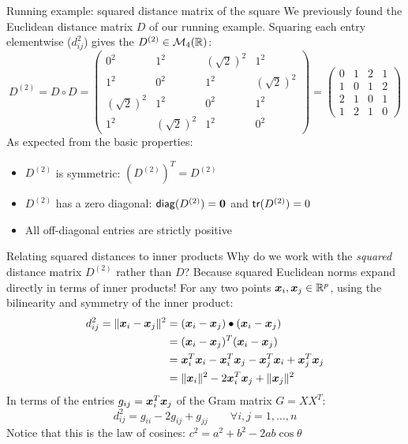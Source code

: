 \documentclass[aspectratio=169]{beamer}\usepackage[]{graphicx}\usepackage[]{xcolor}
\begin{document}
\begin{frame}{Running example: squared distance matrix of the square}
We previously found the Euclidean distance matrix $D$ of our running example.
Squaring each entry elementwise ($d_{ij}^2$) gives the  $D^{(2)}\in\mathcal{M}_4(\mathbb{R})$:
\[
D^{(2)} = D\circ D = \begin{pmatrix}
0^2 & 1^2 & (\sqrt{2})^2 & 1^2 \\
1^2 & 0^2 & 1^2 & (\sqrt{2})^2 \\
(\sqrt{2})^2 & 1^2 & 0^2 & 1^2 \\
1^2 & (\sqrt{2})^2 & 1^2 & 0^2
\end{pmatrix}
= \begin{pmatrix}
0 & 1 & 2 & 1 \\
1 & 0 & 1 & 2 \\
2 & 1 & 0 & 1 \\
1 & 2 & 1 & 0
\end{pmatrix}
\]
\vfill
As expected from the basic properties:
\begin{itemize}
\item $D^{(2)}$ is symmetric: $(D^{(2)})^T = D^{(2)}$
\item $D^{(2)}$ has a zero diagonal: $\diag(D^{(2)}) = \b0$ and $\mathsf{tr}(D^{(2)}) = 0$
\item All off-diagonal entries are strictly positive
\end{itemize}
\end{frame}

\begin{frame}{Relating squared distances to inner products}
Why do we work with the \emph{squared} distance matrix $D^{(2)}$ rather than $D$? Because squared Euclidean norms expand directly in terms of inner products!
\vfill
For any two points $\bm{x}_i,\bm{x}_j\in\mathbb{R}^p$, using the bilinearity and symmetry of the inner product:
\begin{align*}
d_{ij}^2 = \|\bm{x}_i - \bm{x}_j\|^2 &= (\bm{x}_i - \bm{x}_j) \bullet (\bm{x}_i - \bm{x}_j) \\
&= (\bm{x}_i - \bm{x}_j)^T (\bm{x}_i - \bm{x}_j) \\
&= \bm{x}_i^T\bm{x}_i - \bm{x}_i^T\bm{x}_j - \bm{x}_j^T\bm{x}_i + \bm{x}_j^T\bm{x}_j \\
&= \|\bm{x}_i\|^2 - 2\bm{x}_i^T\bm{x}_j + \|\bm{x}_j\|^2
\end{align*}
\vfill
In terms of the entries $g_{ij} = \bm{x}_i^T\bm{x}_j$ of the Gram matrix $G = XX^T$:
\[
d_{ij}^2 = g_{ii} - 2g_{ij} + g_{jj} \qquad \forall i,j=1,\ldots,n
\]
\vfill
Notice that this is the law of cosines: $c^2 = a^2 + b^2 - 2ab\cos\theta$
\end{frame}
\end{document}
